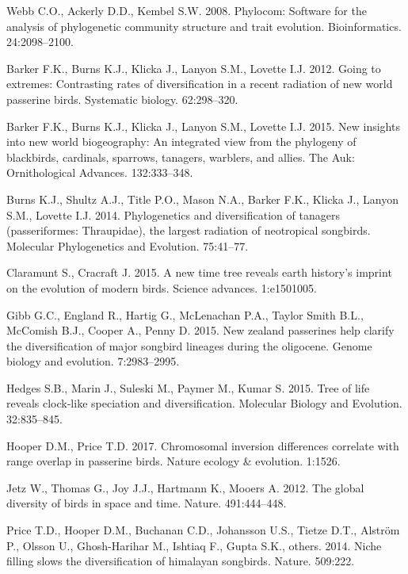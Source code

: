 \documentclass[]{article}
\begin{document}
\leavevmode\hypertarget{ref-Webb2008}{}%
Webb C.O., Ackerly D.D., Kembel S.W. 2008. Phylocom: Software for the analysis of phylogenetic community structure and trait evolution. Bioinformatics. 24:2098--2100.

\leavevmode\hypertarget{ref-barker2012going}{}%
Barker F.K., Burns K.J., Klicka J., Lanyon S.M., Lovette I.J. 2012. Going to extremes: Contrasting rates of diversification in a recent radiation of new world passerine birds. Systematic biology. 62:298--320.

\leavevmode\hypertarget{ref-barker2015new}{}%
Barker F.K., Burns K.J., Klicka J., Lanyon S.M., Lovette I.J. 2015. New insights into new world biogeography: An integrated view from the phylogeny of blackbirds, cardinals, sparrows, tanagers, warblers, and allies. The Auk: Ornithological Advances. 132:333--348.

\leavevmode\hypertarget{ref-burns2014phylogenetics}{}%
Burns K.J., Shultz A.J., Title P.O., Mason N.A., Barker F.K., Klicka J., Lanyon S.M., Lovette I.J. 2014. Phylogenetics and diversification of tanagers (passeriformes: Thraupidae), the largest radiation of neotropical songbirds. Molecular Phylogenetics and Evolution. 75:41--77.

\leavevmode\hypertarget{ref-claramunt2015new}{}%
Claramunt S., Cracraft J. 2015. A new time tree reveals earth history's imprint on the evolution of modern birds. Science advances. 1:e1501005.

\leavevmode\hypertarget{ref-gibb2015new}{}%
Gibb G.C., England R., Hartig G., McLenachan P.A., Taylor Smith B.L., McComish B.J., Cooper A., Penny D. 2015. New zealand passerines help clarify the diversification of major songbird lineages during the oligocene. Genome biology and evolution. 7:2983--2995.

\leavevmode\hypertarget{ref-Hedges2015}{}%
Hedges S.B., Marin J., Suleski M., Paymer M., Kumar S. 2015. Tree of life reveals clock-like speciation and diversification. Molecular Biology and Evolution. 32:835--845.

\leavevmode\hypertarget{ref-hooper2017chromosomal}{}%
Hooper D.M., Price T.D. 2017. Chromosomal inversion differences correlate with range overlap in passerine birds. Nature ecology \& evolution. 1:1526.

\leavevmode\hypertarget{ref-Jetz2012}{}%
Jetz W., Thomas G., Joy J.J., Hartmann K., Mooers A. 2012. The global diversity of birds in space and time. Nature. 491:444--448.

\leavevmode\hypertarget{ref-price2014niche}{}%
Price T.D., Hooper D.M., Buchanan C.D., Johansson U.S., Tietze D.T., Alström P., Olsson U., Ghosh-Harihar M., Ishtiaq F., Gupta S.K., others. 2014. Niche filling slows the diversification of himalayan songbirds. Nature. 509:222.
\end{document}
